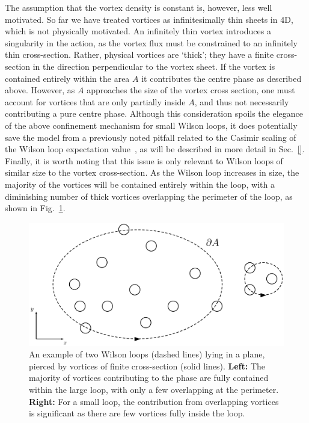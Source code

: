 The assumption that the vortex density is constant is, however, less well motivated. So far we have treated vortices as infinitesimally thin sheets in 4D, which is not physically motivated. An infinitely thin vortex introduces a singularity in the action, as the vortex flux must be constrained to an infinitely thin cross-section. Rather, physical vortices are `thick'; they have a finite cross-section in the direction perpendicular to the vortex sheet. If the vortex is contained entirely within the area $A$ it contributes the centre phase as described above. However, as $A$ approaches the size of the vortex cross section, one must account for vortices that are only partially inside $A$, and thus not necessarily contributing a pure centre phase. Although this consideration spoils the elegance of the above confinement mechanism for small Wilson loops, it does potentially save the model from a previously noted pitfall related to the Casimir scaling of the Wilson loop expectation value~\cite{Greensite:1982be}, as will be described in more detail in Sec.~\ref{}. Finally, it is worth noting that this issue is only relevant to Wilson loops of similar size to the vortex cross-section. As the Wilson loop increases in size, the majority of the vortices will be contained entirely within the loop, with a diminishing number of thick vortices overlapping the perimeter of the loop, as shown in Fig.~\ref{fig:VortexSizes}.\\
%
\begin{figure}[htb!]
\centering
\includegraphics[width=\linewidth]{./LargeVortex.pdf}
\caption{\label{fig:VortexSizes}An example of two Wilson loops (dashed lines) lying in a plane, pierced by vortices of finite cross-section (solid lines). \textbf{Left:} The majority of vortices contributing to the phase are fully contained within the large loop, with only a few overlapping at the perimeter. \textbf{Right:} For a small loop, the contribution from overlapping vortices is significant as there are few vortices fully inside the loop.}
\end{figure}

